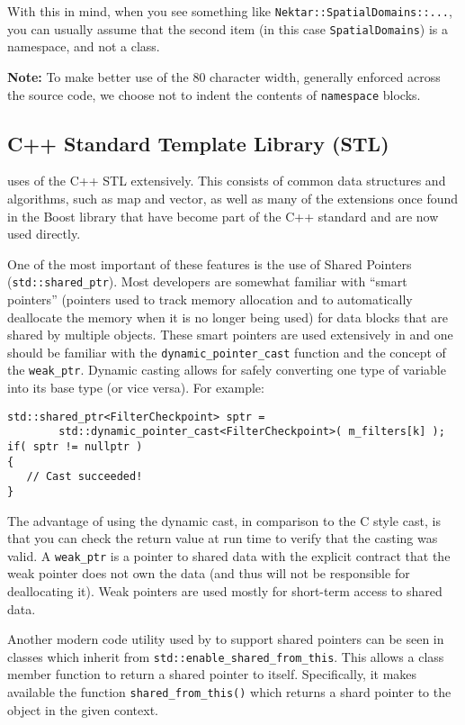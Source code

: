 With this in mind, when you see something like \lstinline{Nektar::SpatialDomains::...}, you can usually assume that the second item (in this case \lstinline{SpatialDomains}) is a namespace, and not a class.

\textbf{Note:} To make better use of the 80 character width, generally enforced across the {\nek} source code, we choose not to indent the contents of \lstinline|namespace| blocks.


\subsection{C++ Standard Template Library (STL) }
{\nek} uses of the C++ STL extensively.  This consists of common data structures and algorithms, such as map and vector, as well as many of the extensions once found in the Boost library that have become part of the C++ standard and are now used directly.

One of the most important of these features is
the use of Shared Pointers (\lstinline|std::shared_ptr|).  Most developers are
somewhat familiar with ``smart pointers'' (pointers used to track
memory allocation and to automatically deallocate the memory when it
is no longer being used) for data blocks that are shared by multiple
objects. These smart pointers are used extensively in {\nek} and
one should be familiar with the \lstinline|dynamic_pointer_cast| function
and the concept of the \lstinline|weak_ptr|.  Dynamic casting allows for safely
converting one type of variable into its base type (or vice
versa). For example:
\begin{lstlisting}
std::shared_ptr<FilterCheckpoint> sptr =
        std::dynamic_pointer_cast<FilterCheckpoint>( m_filters[k] );
if( sptr != nullptr ) 
{ 
   // Cast succeeded!
}
\end{lstlisting}

The advantage of using the dynamic cast, in comparison to the C style
cast, is that you can check the return value at run time to verify
that the casting was valid.  A \lstinline|weak_ptr| is a pointer to shared
data with the explicit contract that the weak pointer does not own
the data (and thus will not be responsible for deallocating it).
Weak pointers are used mostly for short-term access to shared data.

Another modern code utility used by {\nek} to support shared
pointers can be seen in {\nek} classes which inherit from
\lstinline|std::enable_shared_from_this|. This allows a class member function to return a shared pointer to itself. Specifically, it makes available the function \lstinline|shared_from_this()| which returns a shard pointer to the object in the given context.

